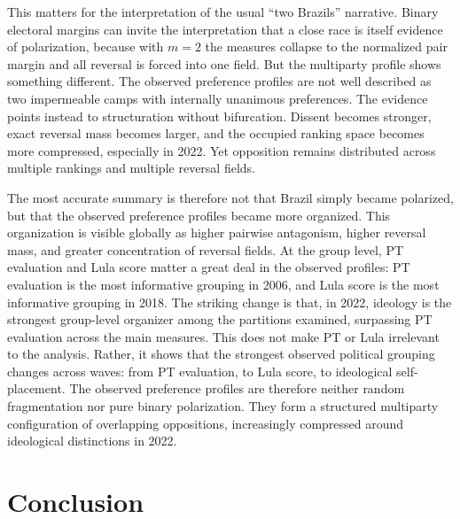 \documentclass[12pt]{article}
\begin{document}
This matters for the interpretation of the usual ``two Brazils'' narrative.
Binary electoral margins can invite the interpretation that a close race is
itself evidence of polarization, because with \(m=2\) the measures collapse to
the normalized pair margin and all reversal is forced into one field. But the
multiparty profile shows something different. The observed preference profiles
are not well described as two impermeable camps with internally unanimous
preferences. The evidence points instead to structuration without bifurcation.
Dissent becomes stronger, exact reversal mass becomes larger, and the occupied
ranking space becomes more compressed, especially in 2022. Yet opposition
remains distributed across multiple rankings and multiple reversal fields.

The most accurate summary is therefore not that Brazil simply became
polarized, but that the observed preference profiles became more organized.
This organization is visible globally as higher pairwise antagonism, higher
reversal mass, and greater concentration of reversal fields. At the group
level, PT evaluation and Lula score matter a great deal in the observed
profiles: PT evaluation is the most informative grouping in 2006, and Lula
score is the most informative grouping in 2018. The striking change is that,
in 2022, ideology is the strongest group-level organizer among the partitions
examined, surpassing PT evaluation across the main measures. This does not
make PT or Lula irrelevant to the analysis. Rather, it shows that the strongest
observed political grouping changes across waves: from PT evaluation, to Lula
score, to ideological self-placement. The observed preference profiles are
therefore neither random fragmentation nor pure binary polarization. They form
a structured multiparty configuration of overlapping oppositions, increasingly
compressed around ideological distinctions in 2022.

\section*{Conclusion}
\end{document}
